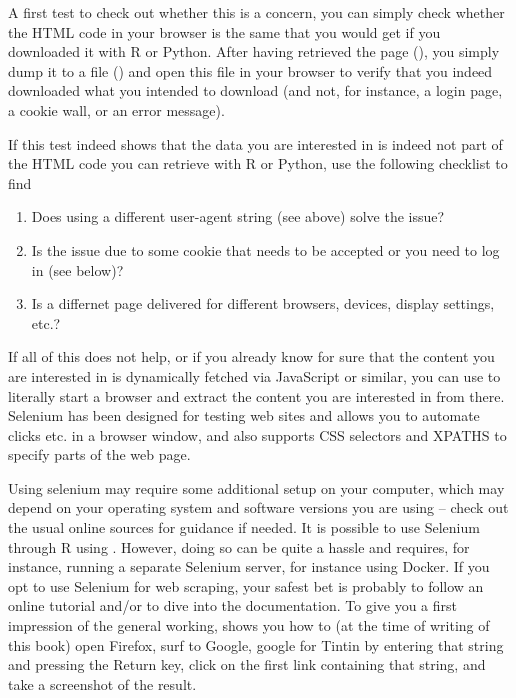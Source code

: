 A first test to check out whether this is a concern, you can simply
check whether the HTML code in your browser is the same that you would
get if you downloaded it with R or Python.  After having retrieved the
page (), you simply dump it to a file
() and open this file in your browser to verify that
you indeed downloaded what you intended to download (and not, for
instance, a login page, a cookie wall, or an error message).



If this test indeed shows that the data you are interested in is
indeed not part of the HTML code you can retrieve with R or Python,
use the following checklist to find

\begin{enumerate}
\item Does using a different user-agent string (see above) solve the issue?
\item Is the issue due to some cookie that needs to be accepted or you need to log in (see below)?
\item Is a differnet page delivered for different browsers, devices, display settings, etc.?
\end{enumerate}

If all of this does not help, or if you already know for sure that the
content you are interested in is dynamically fetched via JavaScript or
similar, you can use  to literally start a browser and
extract the content you are interested in from there. Selenium has
been designed for testing web sites and allows you to automate clicks
etc. in a browser window, and also supports CSS selectors and XPATHS
to specify parts of the web page.

Using selenium may require some additional setup on your computer,
which may depend on your operating system and software versions you
are using -- check out the usual online sources for guidance if
needed.  It is possible to use Selenium through R using
. However, doing so can be quite a hassle and requires,
for instance, running a separate Selenium server, for instance using
Docker. If you opt to use Selenium for web scraping, your safest bet
is probably to follow an online tutorial and/or to dive into the
documentation. To give you a first impression of the general working,
 shows you how to (at the time of writing of this
book) open Firefox, surf to Google, google for Tintin by entering that
string and pressing the Return key, click on the first link containing
that string, and take a screenshot of the result.

